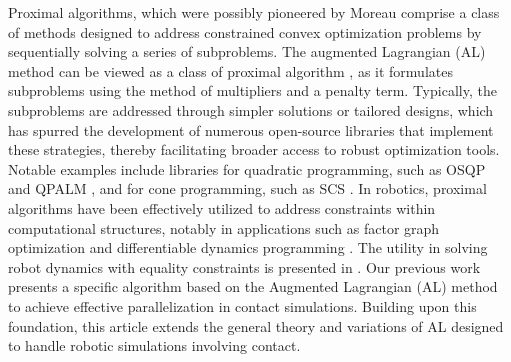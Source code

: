Proximal algorithms, which were possibly pioneered by Moreau \cite{moreau1962fonctions} comprise a class of methods designed to address constrained convex optimization problems by sequentially solving a series of subproblems. 
The augmented Lagrangian (AL) method can be viewed as a class of proximal algorithm \cite{parikh2014proximal}, as it formulates subproblems using the method of multipliers and a penalty term. 
Typically, the subproblems are addressed through simpler solutions or tailored designs, which has spurred the development of numerous open-source libraries that implement these strategies, thereby facilitating broader access to robust optimization tools. Notable examples include libraries for quadratic programming, such as OSQP \cite{stellato2020osqp} and QPALM \cite{hermans2019qpalm}, and for cone programming, such as SCS \cite{sopasakis2019superscs}.
In robotics, proximal algorithms have been effectively utilized to address constraints within computational structures, notably in applications such as factor graph optimization \cite{bazzana2024augmented} and differentiable dynamics programming \cite{howell2019altro}.
The utility in solving robot dynamics with equality constraints is presented in \cite{carpentier2021proximal}. 
Our previous work \cite{lee2023modular} presents a specific algorithm based on the Augmented Lagrangian (AL) method to achieve effective parallelization in contact simulations. Building upon this foundation, this article extends the general theory and variations of AL designed to handle robotic simulations involving contact.